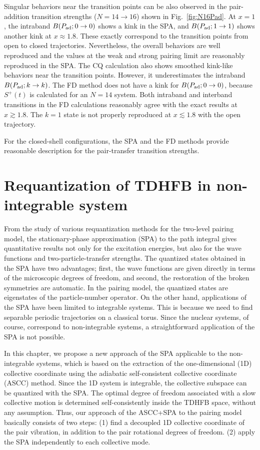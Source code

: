 \documentclass[11pt]{book} %
\begin{document}
Singular behaviors near the transition points can be also observed in
the pair-addition transition strengths ($N=14\rightarrow 16$) shown
in Fig.~\ref{fig:N16Pad}. 
At $x=1$, the intraband $B(P_{\rm ad}; 0\rightarrow 0)$ shows a kink
in the SPA,
and $B(P_{\rm ad}; 1\rightarrow 1)$ shows another kink at $x\approx 1.8$.
These exactly correspond to the transition points from open to closed
trajectories.
Nevertheless, the overall behaviors are well reproduced and
the values at the weak and strong pairing limit are reasonably reproduced
in the SPA.
The CQ calculation also shows smoothed kink-like behaviors near the
transition points.
However, it underestimates the intraband $B(P_{\rm ad}; k\rightarrow k)$.
The FD method does not have a kink for $B(P_{\rm ad}; 0\rightarrow 0)$,
because $S^+(t)$ is calculated for an $N=14$ system.
Both intraband and interband transitions in the FD calculations
reasonably agree with the exact results at $x\gtrsim 1.8$.
The $k=1$ state is not properly reproduced at $x\lesssim 1.8$
with the open trajectory.

For the closed-shell configurations,
the SPA and the FD methods provide reasonable description for the
pair-transfer transition strengths.


\clearpage{\pagestyle{empty}\cleardoublepage}
\chapter{Requantization of TDHFB in non-integrable system}
\label{non-integrable}

From the study of various requantization methods for the two-level pairing model,
the stationary-phase approximation (SPA) to the path integral \cite{SM88} 
gives quantitative results not only for the excitation energies, 
but also for the wave functions and two-particle-transfer strengths.
The quantized states obtained in the SPA have two advantages;
first, the wave functions are given directly in terms of
the microscopic degrees of freedom, and second,
the restoration of the broken symmetries are automatic.
In the pairing model, the quantized states are eigenstates of the particle-number
operator.
On the other hand, applications of the SPA have been limited to
integrable systems.
This is because we need to find separable periodic trajectories on a classical
torus.
Since the nuclear systems, of course, correspond to non-integrable systems,
a straightforward application of the SPA is not possible.

In this chapter,
we propose a new approach of the SPA applicable to the non-integrable systems,
which is based on the extraction of the one-dimensional (1D)
collective coordinate
using the adiabatic self-consistent collective coordinate (ASCC) method.
Since the 1D system is integrable,
the collective subspace can be quantized with the SPA.
The optimal degree of freedom associated with a slow collective motion
is determined self-consistently
inside the TDHFB space, without any assumption. 
Thus, our approach of the ASCC+SPA to the pairing model
basically consists of two steps:
(1) find a decoupled 1D collective coordinate of the pair vibration,
in addition to the pair rotational degrees of freedom.
(2) apply the SPA independently to each collective mode.
\end{document}
